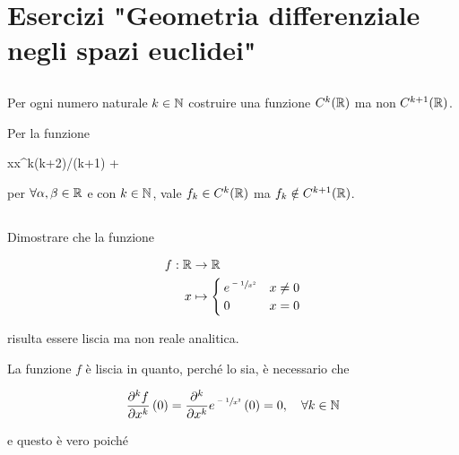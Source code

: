 \chapter{Esercizi "Geometria differenziale negli spazi euclidei"}

\setcounter{tocdepth}{2}

\tocless\section{}\label{es1-1}

\begin{tcolorbox}
	Per ogni numero naturale $ k \in \mathbb{N} $ costruire una funzione $ C^{k}(\mathbb{R}) $ ma non $ C^{k+1}(\mathbb{R}) $.
\end{tcolorbox}

Per la funzione

%
	{\R}{\R}%
	{x}{\alpha x^{k(k+2)/(k+1)} + \beta}
	
per $ \forall \alpha,\beta \in \mathbb{R} $ e con $ k \in \mathbb{N} $, vale $ f_{k} \in C^{k}(\mathbb{R}) $ ma $ f_{k} \notin C^{k+1}(\mathbb{R}) $.

\tocless\section{}\label{es1-2}

\begin{tcolorbox}
	Dimostrare che la funzione
	
	\begin{align}
		\begin{split}
			f : \R & \to \R\\
			x &\mapsto%
				\begin{cases}
					e^{\sfrac{-1}{x^{2}}} & x \neq 0\\
					0 & x = 0
				\end{cases}
		\end{split}
	\end{align}
	
	risulta essere liscia ma non reale analitica.
\end{tcolorbox}

La funzione $ f $ è liscia in quanto, perché lo sia, è necessario che

\begin{equation}
	\pdv[k]{f}{x} \, (0) = \pdv[k]{x} e^{\sfrac{-1}{x^{2}}} \, (0) = 0 \qcomma \forall k \in \N
\end{equation}

e questo è vero poiché

